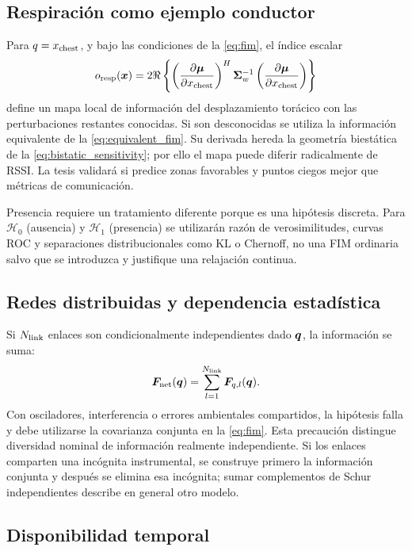 \subsection{Respiración como ejemplo conductor}

Para $q=x_{\rm chest}$, y bajo las condiciones de la \cref{eq:fim}, el índice escalar
\begin{equation}
o_{\rm resp}(\bm{x})=
2\Re\left\{
\left(\frac{\partial\bm{\mu}}{\partial x_{\rm chest}}\right)^H
\bm{\Sigma}_w^{-1}
\left(\frac{\partial\bm{\mu}}{\partial x_{\rm chest}}\right)
\right\}
\label{eq:resp_observability}
\end{equation}
define un mapa local de información del desplazamiento torácico con las
perturbaciones restantes conocidas. Si son desconocidas se utiliza la
información equivalente de la \cref{eq:equivalent_fim}. Su derivada hereda la geometría biestática de la \cref{eq:bistatic_sensitivity}; por ello el mapa puede diferir radicalmente de RSSI. La tesis validará si predice zonas favorables y puntos ciegos mejor que métricas de comunicación.

Presencia requiere un tratamiento diferente porque es una hipótesis discreta. Para $\mathcal H_0$ (ausencia) y $\mathcal H_1$ (presencia) se utilizarán razón de verosimilitudes, curvas ROC y separaciones distribucionales como KL o Chernoff, no una FIM ordinaria salvo que se introduzca y justifique una relajación continua.

\subsection{Redes distribuidas y dependencia estadística}

Si $N_{\rm link}$ enlaces son condicionalmente independientes dado $\bm{q}$, la información se suma:
\begin{equation}
\bm{F}_{\rm net}(\bm{q})
=\sum_{l=1}^{N_{\rm link}}\bm{F}_{q,l}(\bm{q}).
\label{eq:fim_network}
\end{equation}
Con osciladores, interferencia o errores ambientales compartidos, la hipótesis falla y debe utilizarse la covarianza conjunta en la \cref{eq:fim}. Esta precaución distingue diversidad nominal de información realmente independiente.
Si los enlaces comparten una incógnita instrumental, se construye primero
la información conjunta y después se elimina esa incógnita; sumar
complementos de Schur independientes describe en general otro modelo.

\subsection{Disponibilidad temporal}

